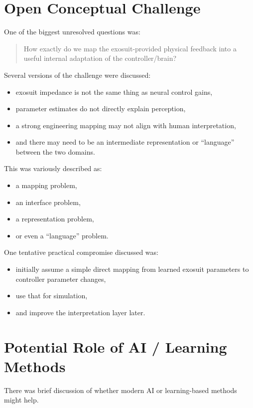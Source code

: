 \documentclass[11pt]{article}
\begin{document}
\section{Open Conceptual Challenge}
One of the biggest unresolved questions was:

\begin{quote}
How exactly do we map the exosuit-provided physical feedback into a useful internal adaptation of the controller/brain?
\end{quote}

Several versions of the challenge were discussed:
\begin{itemize}[leftmargin=1.5em]
    \item exosuit impedance is not the same thing as neural control gains,
    \item parameter estimates do not directly explain perception,
    \item a strong engineering mapping may not align with human interpretation,
    \item and there may need to be an intermediate representation or ``language'' between the two domains.
\end{itemize}

This was variously described as:
\begin{itemize}[leftmargin=1.5em]
    \item a mapping problem,
    \item an interface problem,
    \item a representation problem,
    \item or even a ``language'' problem.
\end{itemize}

One tentative practical compromise discussed was:
\begin{itemize}[leftmargin=1.5em]
    \item initially assume a simple direct mapping from learned exosuit parameters to controller parameter changes,
    \item use that for simulation,
    \item and improve the interpretation layer later.
\end{itemize}

\section{Potential Role of AI / Learning Methods}
There was brief discussion of whether modern AI or learning-based methods might help.
\end{document}
